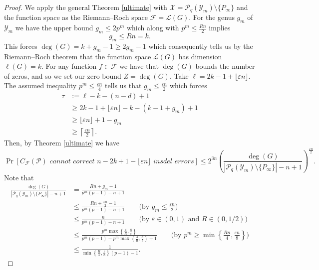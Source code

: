 \documentclass[10pt,a4paper]{amsart}
\begin{document}
\begin{proof}
    We apply the general Theorem \ref{ultimate} with $\mathcal{X} = \mathcal{P}_q(\mathcal{Y}_m) \setminus \{P_\infty\}$ and the function space as the Riemann--Roch space $\mathcal{F} =\mathcal{L}(G)$.
    For the genus $g_m$ of $\mathcal{Y}_m$ we have the upper bound $g_m \leq 2p^m$ which along with $p^m \leq \frac{Rn}{2}$ implies $$g_m \leq Rn = k. $$
    This forces $\deg(G) = k + g_m - 1 \geq 2g_m - 1$ which consequently tells us by the Riemann--Roch theorem that the function space $\mathcal{L}(G)$ has dimension $\ell(G) = k$. 
    For any function $f \in \mathcal{F}$ we have that $\deg(G)$ bounds the number of zeros, and so we set our zero bound $Z = \deg(G)$. 
    Take $\ell = 2k - 1 + \lfloor \varepsilon n \rfloor$. The assumed inequality $p^m \leq \frac{\varepsilon n}{4}$ tells us that $g_m \leq \frac{\varepsilon n}{2}$ which forces 
    \begin{align*}
        \tau &:= \ell - k - (n-d) + 1 \\
        & \geq 2k - 1 + \lfloor \varepsilon n \rfloor - k - (k-1+g_m) + 1 \\
        & \geq  \lfloor \varepsilon n \rfloor + 1 - g_m \\
        & \geq \left\lceil\frac{\varepsilon n}{2} \right\rceil .
    \end{align*}
    Then, by Theorem \ref{ultimate} we have 
    $$\Pr[C_{\mathcal{F}}(\mathcal{P}) \textit{ cannot correct $n-2k + 1 - \lfloor \varepsilon n \rfloor$ insdel errors}] \leq 2^{3n}\left(\frac{\deg(G)}{|\mathcal{P}_q(\mathcal{Y}_m) \setminus \{P_\infty\}| - n + 1}\right)^{\frac{\varepsilon n}{2}}.$$
    Note that
    \begin{align*}
        \frac{\deg(G)}{|\mathcal{P}_q(\mathcal{Y}_m) \setminus \{P_\infty\}| - n + 1} &= \frac{Rn + g_m - 1}{p^m(p-1) - n + 1} \\
        & \leq \frac{Rn + \frac{\varepsilon n}{2}  - 1}{p^m(p-1) - n + 1} \qquad \text{(by $g_m \leq \frac{\varepsilon n}{2}$)}\\
        & \leq \frac{n}{p^m(p-1) - n + 1} \qquad \text{(by $\varepsilon \in (0,1)$ and $R \in (0, 1/2)$)}\\
        & \leq \frac{p^m \max\left\lbrace \frac{4}{R}, \frac{8}{\varepsilon}\right\rbrace}{p^m(p-1)- p^m\max\left\lbrace \frac{4}{R}, \frac{8}{\varepsilon}\right\rbrace + 1} \qquad \text{(by $p^m \geq \min\left\lbrace \frac{Rn}{4}, \frac{\varepsilon n}{8}\right\rbrace$)} \\
        & \leq \frac{1}{\min\left\lbrace \frac{R}{4}, \frac{\varepsilon}{8}\right\rbrace(p-1)-1}. 

\end{align*}
\end{proof}
\end{document}
